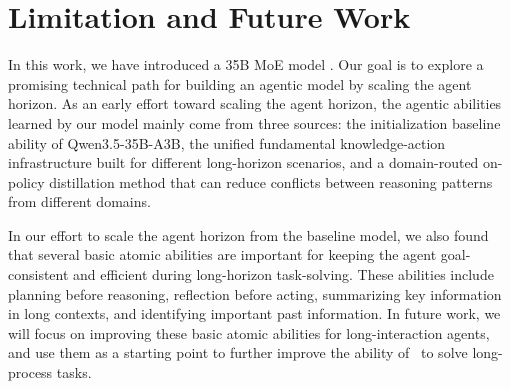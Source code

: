 
\section{Limitation and Future Work}
In this work, we have introduced a 35B MoE model \ProjectName. Our goal is to explore a promising technical path for building an agentic model by scaling the agent horizon. As an early effort toward scaling the agent horizon, the agentic abilities learned by our model mainly come from three sources: the initialization baseline ability of Qwen3.5-35B-A3B, the unified fundamental knowledge-action infrastructure built for different long-horizon scenarios, and a domain-routed on-policy distillation method that can reduce conflicts between reasoning patterns from different domains.

In our effort to scale the agent horizon from the baseline model, we also found that several basic atomic abilities are important for keeping the agent goal-consistent and efficient during long-horizon task-solving. These abilities include planning before reasoning, reflection before acting, summarizing key information in long contexts, and identifying important past information. In future work, we will focus on improving these basic atomic abilities for long-interaction agents, and use them as a starting point to further improve the ability of \ProjectName~to solve long-process tasks.